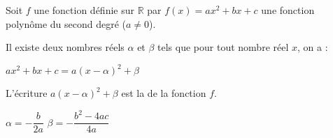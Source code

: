 \begin{Propriete}
    Soit $f$ une fonction définie sur $\mathbb{R}$ par $f(x) = ax^{2} + bx + c$ une fonction polynôme du second degré ($a \neq 0$). 
    
    Il existe deux nombres réels $\alpha$ et $\beta$ tels que pour tout nombre réel $x$, on a :
    \begin{center}$ax^{2} + bx + c = a(x-\alpha)^{2} + \beta$\end{center}
    
    L'écriture $a(x-\alpha)^{2} +\beta$ est la de la fonction $f$.
    
    \begin{tcbenumerate}[2]
        \tcbitem[halign=center] $\alpha = -\dfrac{b}{2a}$
        \tcbitem[halign=center] $\beta = -\dfrac{b^2-4ac}{4a}$
    \end{tcbenumerate}
\end{Propriete}